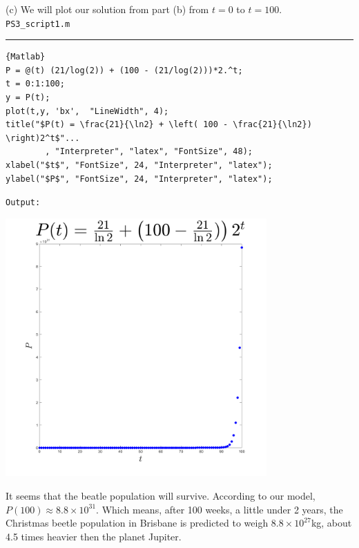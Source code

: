 \documentclass[a4paper, 11pt]{report}
\begin{document}
\pagebreak
\sol (c) We will plot our solution from part (b) from $t=0$ to $t=100$.\\
\verb|PS3_script1.m| \hrule
\begin{lstlisting}{Matlab}
P = @(t) (21/log(2)) + (100 - (21/log(2)))*2.^t;
t = 0:1:100;
y = P(t);
plot(t,y, 'bx',  "LineWidth", 4);
title("$P(t) = \frac{21}{\ln2} + \left( 100 - \frac{21}{\ln2}) \right)2^t$"...
		, "Interpreter", "latex", "FontSize", 48);
xlabel("$t$", "FontSize", 24, "Interpreter", "latex");
ylabel("$P$", "FontSize", 24, "Interpreter", "latex");
\end{lstlisting}
\verb|Output:|\\
\begin{center}
	\includegraphics[width=0.75\textwidth]{PS3_fig1.png}
\end{center}
It seems that the beatle population will survive. According to our model, $P(100)\approx 8.8\times10^{31}$. Which means, after 100 weeks, a little under 2 years, the Christmas beetle population in Brisbane is predicted to weigh $8.8\times10^{27}$kg, about 4.5 times heavier then the planet Jupiter.
\end{document}
